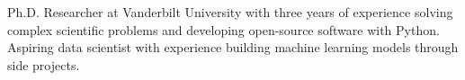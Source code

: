 
\begin{cvparagraph}
    Ph.D. Researcher at Vanderbilt University with three years of experience 
    solving complex
    scientific problems and developing open-source software with Python. 
    Aspiring data scientist with experience building machine learning models
    through side projects.

\end{cvparagraph}
